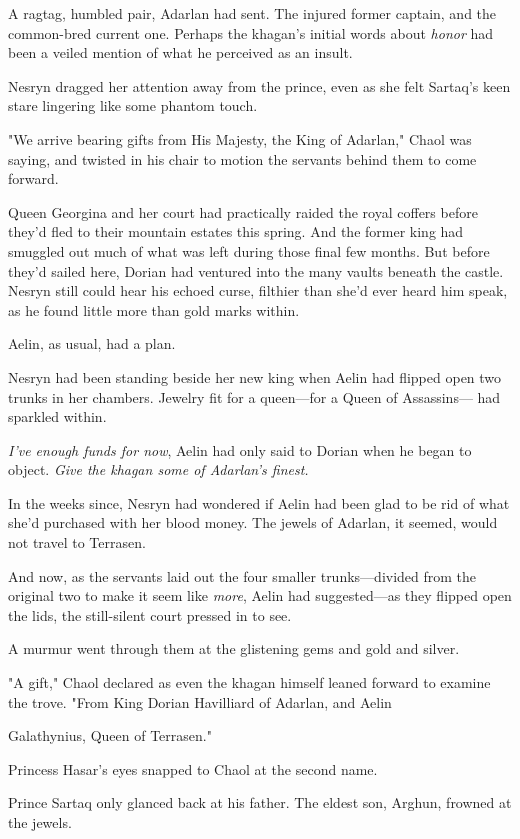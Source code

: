 A ragtag, humbled pair, Adarlan had sent. The injured former captain, and the common-bred current one. Perhaps the khagan's initial words about \emph{honor} had been a veiled mention of what he perceived as an insult.

Nesryn dragged her attention away from the prince, even as she felt Sartaq's keen stare lingering like some phantom touch.

"We arrive bearing gifts from His Majesty, the King of Adarlan," Chaol was saying, and twisted in his chair to motion the servants behind them to come forward.

Queen Georgina and her court had practically raided the royal coffers before they'd fled to their mountain estates this spring. And the former king had smuggled out much of what was left during those final few months. But before they'd sailed here, Dorian had ventured into the many vaults beneath the castle. Nesryn still could hear his echoed curse, filthier than she'd ever heard him speak, as he found little more than gold marks within.

Aelin, as usual, had a plan.

Nesryn had been standing beside her new king when Aelin had flipped open two trunks in her chambers. Jewelry fit for a queen---for a Queen of Assassins--- had sparkled within.

\emph{I've enough funds for now}, Aelin had only said to Dorian when he began to object. \emph{Give the khagan some of Adarlan's finest.}

In the weeks since, Nesryn had wondered if Aelin had been glad to be rid of what she'd purchased with her blood money. The jewels of Adarlan, it seemed, would not travel to Terrasen.

And now, as the servants laid out the four smaller trunks---divided from the original two to make it seem like \emph{more}, Aelin had suggested---as they flipped open the lids, the still-silent court pressed in to see.

A murmur went through them at the glistening gems and gold and silver.

"A gift," Chaol declared as even the khagan himself leaned forward to examine the trove. "From King Dorian Havilliard of Adarlan, and Aelin

Galathynius, Queen of Terrasen."

Princess Hasar's eyes snapped to Chaol at the second name.

Prince Sartaq only glanced back at his father. The eldest son, Arghun, frowned at the jewels.

